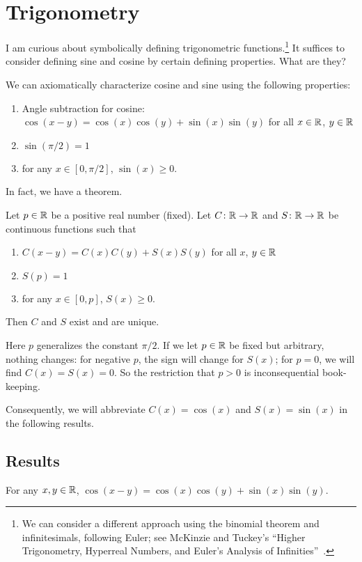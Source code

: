 \chapter{Trigonometry}

\M I am curious about symbolically defining trigonometric
functions.\footnote{We can consider a different approach using the
binomial theorem and infinitesimals, following Euler; see McKinzie and
Tuckey's ``Higher Trigonometry, Hyperreal Numbers, and Euler’s Analysis of Infinities''~\cite{mckinzie}.} It
suffices to consider defining sine and cosine by certain defining
properties. What are they?

We can axiomatically characterize cosine and sine using the following
properties:
\begin{enumerate}
\item Angle subtraction for cosine: $\cos(x-y) = \cos(x)\cos(y) + \sin(x)\sin(y)$ for all $x\in\mathbb{R}$, $y\in\mathbb{R}$
\item $\sin(\pi/2)=1$
\item for any $x\in[0,\pi/2]$, $\sin(x)\geq0$.
\end{enumerate}
In fact, we have a theorem.

\begin{theorem}
Let $p\in\mathbb{R}$ be a positive real number (fixed). Let $C\colon\mathbb{R}\to\mathbb{R}$
and $S\colon\mathbb{R}\to\mathbb{R}$ be continuous functions such that
\begin{enumerate}
\item $C(x-y) = C(x)C(y) + S(x)S(y)$ for all $x$, $y\in\mathbb{R}$
\item $S(p)=1$
\item for any $x\in[0,p]$, $S(x)\geq0$.
\end{enumerate}
Then $C$ and $S$ exist and are unique.
\end{theorem}

Here $p$ generalizes the constant $\pi/2$. If we let $p\in\mathbb{R}$ be fixed
but arbitrary, nothing changes: for negative $p$, the sign will change
for $S(x)$; for $p=0$, we will find $C(x)=S(x)=0$. So the restriction
that $p>0$ is inconsequential book-keeping.

Consequently, we will abbreviate $C(x)=\cos(x)$ and $S(x)=\sin(x)$ in
the following results.

\section{Results}

\begin{axiom}\label{axiom:trigonometry:cos-subtraction-law}
For any $x,y\in\mathbb{R}$,  $\cos(x-y) = \cos(x)\cos(y) + \sin(x)\sin(y)$.
\end{axiom}

